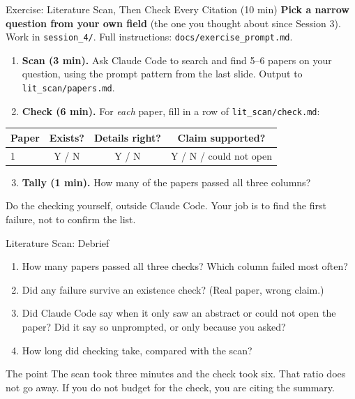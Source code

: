 \documentclass[aspectratio=169, 11pt]{beamer}
\begin{document}
\begin{frame}[fragile]{Exercise: Literature Scan, Then Check Every Citation (10 min)}
  \small
  \textbf{Pick a narrow question from your own field} (the one you thought about since Session 3). Work in \texttt{session\_4/}. Full instructions: \texttt{docs/exercise\_prompt.md}.

  \vspace{0.3em}
  \begin{enumerate}
    \item \textbf{Scan (3 min).} Ask Claude Code to search and find 5--6 papers on your question, using the prompt pattern from the last slide. Output to \texttt{lit\_scan/papers.md}.
    \item \textbf{Check (6 min).} For \emph{each} paper, fill in a row of \texttt{lit\_scan/check.md}:
  \end{enumerate}

  \vspace{0.2em}
  \begin{tabular}{@{}lccc@{}}
    \toprule
    \textbf{Paper} & \textbf{Exists?} & \textbf{Details right?} & \textbf{Claim supported?} \\
    \midrule
    1 & Y / N & Y / N & Y / N / could not open \\
    \bottomrule
  \end{tabular}

  \vspace{0.4em}
  \begin{enumerate}
    \setcounter{enumi}{2}
    \item \textbf{Tally (1 min).} How many of the papers passed all three columns?
  \end{enumerate}

  \vspace{0.3em}
  \alert{Do the checking yourself, outside Claude Code. Your job is to find the first failure, not to confirm the list.}
\end{frame}

\begin{frame}{Literature Scan: Debrief}
  \begin{enumerate}
    \item How many papers passed all three checks? Which column failed most often?
    \item Did any failure survive an existence check? (Real paper, wrong claim.)
    \item Did Claude Code say when it only saw an abstract or could not open the paper? Did it say so unprompted, or only because you asked?
    \item How long did checking take, compared with the scan?
  \end{enumerate}

  \vspace{0.5em}
  \begin{block}{The point}
    The scan took three minutes and the check took six. That ratio does not go away. If you do not budget for the check, you are citing the summary.
  \end{block}
\end{frame}
\end{document}
